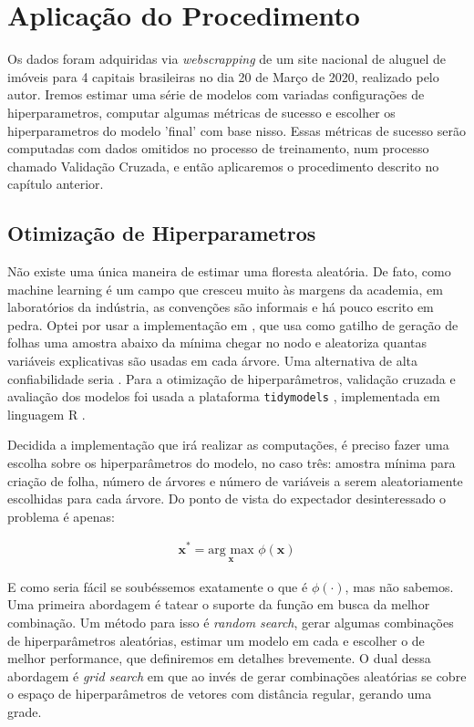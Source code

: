 

\chapter{Aplicação do Procedimento}

Os dados foram adquiridas via \textit{webscrapping} de um site nacional de aluguel de imóveis para 4 capitais brasileiras no dia 20 de Março de 2020, realizado pelo autor. Iremos estimar uma série de modelos com variadas configurações de hiperparametros, computar algumas métricas de sucesso e escolher os hiperparametros do modelo 'final' com base nisso. Essas métricas de sucesso serão computadas com dados omitidos no processo de treinamento, num processo chamado Validação Cruzada, e então aplicaremos o procedimento descrito no capítulo anterior.

\section{Otimização de Hiperparametros}

Não existe uma única maneira de estimar uma floresta aleatória. De fato, como machine learning é um campo que cresceu muito às margens da academia, em laboratórios da indústria, as convenções são informais e há pouco escrito em pedra. Optei por usar a implementação em , que usa como gatilho de geração de folhas uma amostra abaixo da mínima chegar no nodo e aleatoriza quantas variáveis explicativas são usadas em cada árvore. Uma alternativa de alta confiabilidade seria . Para a otimização de hiperparâmetros, validação cruzada e avaliação dos modelos foi usada a plataforma \texttt{tidymodels} \cite{tidymodels}, implementada em linguagem R \cite{R}.

Decidida a implementação que irá realizar as computações, é preciso fazer uma escolha sobre os hiperparâmetros do modelo, no caso três: amostra mínima para criação de folha, número de árvores e número de variáveis a serem aleatoriamente escolhidas para cada árvore. Do ponto de vista do expectador desinteressado o problema é apenas:

\begin{align}
    \mathbf{x}^* = \underset{\mathbf{x}}{\text{arg max}} \,\,\phi(\mathbf{x}) 
\end{align}

E como seria fácil se soubéssemos exatamente o que é $\phi(\cdot)$, mas não sabemos. Uma primeira abordagem é tatear o suporte da função em busca da melhor combinação. Um método para isso é \textit{random search}, gerar algumas combinações de hiperparâmetros aleatórias, estimar um modelo em cada e escolher o de melhor performance, que definiremos em detalhes brevemente. O dual dessa abordagem é \textit{grid search} em que ao invés de gerar combinações aleatórias se cobre o espaço de hiperparâmetros de vetores com distância regular, gerando uma grade. 

